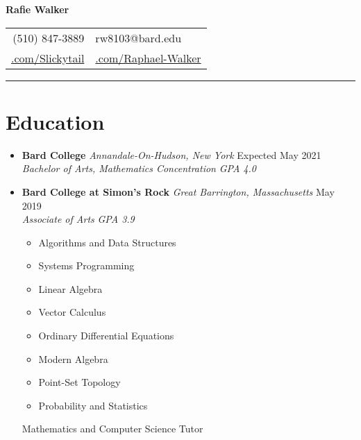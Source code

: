 \documentclass[12pt,letterpaper]{article}
\begin{document}
\begin{center}
	{\LARGE{\textbf{Rafie Walker}}}\\[0.05in]

	\begin{tabular}{r @{\hskip 0.1in}|@{\hskip 0.1in} l}
		(510) 847-3889 & rw8103@bard.edu \\
		 \href{https://github.com/Slickytail}{\faGithub.com/Slickytail} &
		 \href{https://linkedin.com/in/raphael-walker}{\faLinkedinSquare.com/Raphael-Walker}
	\end{tabular}
\end{center}
\hrule \vspace{-0.5em}

\section*{Education} \vspace{-0.5em}
\begin{itemize}[label=,itemsep=0pt]
	\item
	\textbf{Bard College} \textit{Annandale-On-Hudson, New York} \hfill Expected May 2021\\
	\textit{Bachelor of Arts, Mathematics Concentration} \hfill \textit{GPA 4.0}
	\item
	\textbf{Bard College at Simon's Rock} \textit{Great Barrington, Massachusetts} \hfill May 2019\\
	\textit{Associate of Arts} \hfill \textit{GPA 3.9}\\
	\vspace{-2.2em}
	\begin{multicols}{2}
		\noindent
		\begin{itemize}[label=\textbf{--},itemsep=0pt,topsep=0pt,partopsep=0pt,parsep=0pt]
			\item Algorithms and Data Structures
			\item Systems Programming
			\item Linear Algebra
			\item Vector Calculus
			\item Ordinary Differential Equations
			\item Modern Algebra
			\item Point-Set Topology
			\item Probability and Statistics
		\end{itemize}
	\end{multicols}
	\vspace{-1em}
	Mathematics and Computer Science Tutor
\end{itemize}
\vspace{-2.5em}
\end{document}
